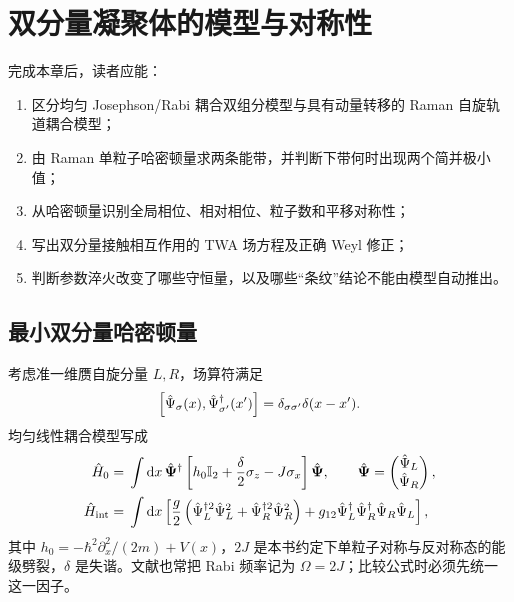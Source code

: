 \chapter{双分量凝聚体的模型与对称性}
\label{ch:two-component-model}

\begin{learningobjectives}
完成本章后，读者应能：
\begin{enumerate}
  \item 区分均匀 Josephson/Rabi 耦合双组分模型与具有动量转移的 Raman 自旋轨道耦合模型；
  \item 由 Raman 单粒子哈密顿量求两条能带，并判断下带何时出现两个简并极小值；
  \item 从哈密顿量识别全局相位、相对相位、粒子数和平移对称性；
  \item 写出双分量接触相互作用的 TWA 场方程及正确 Weyl 修正；
  \item 判断参数淬火改变了哪些守恒量，以及哪些“条纹”结论不能由模型自动推出。
\end{enumerate}
\end{learningobjectives}

\section{最小双分量哈密顿量}

考虑准一维赝自旋分量 $L,R$，场算符满足
\begin{equation}
  \left[\hat\Psi_\sigma(x),\hat\Psi_{\sigma'}^\dagger(x')\right]
  =\delta_{\sigma\sigma'}\delta(x-x').
\end{equation}
均匀线性耦合模型写成
\begin{align}
  \hat H_0={}&\int\mathop{}\!\mathrm{d} x\,
  \hat{\bm\Psi}^\dagger
  \left[h_0\mathbb{I}_2+\frac{\delta}{2}\sigma_z-J\sigma_x\right]
  \hat{\bm\Psi},
  \qquad
  \hat{\bm\Psi}=\begin{pmatrix}\hat\Psi_L\\\hat\Psi_R\end{pmatrix},
  \label{eq:uniform-two-component-h0}\\
  \hat H_{\rm int}={}&\int\mathop{}\!\mathrm{d} x\left[
  \frac{g}{2}\left(
  \hat\Psi_L^{\dagger2}\hat\Psi_L^2+
  \hat\Psi_R^{\dagger2}\hat\Psi_R^2\right)
  +g_{12}\hat\Psi_L^\dagger\hat\Psi_R^\dagger
  \hat\Psi_R\hat\Psi_L\right],
  \label{eq:two-component-interaction}
\end{align}
其中 $h_0=-\hbar^2\partial_x^2/(2m)+V(x)$，$2J$ 是本书约定下单粒子对称与反对称态的能级劈裂，$\delta$ 是失谐。文献也常把 Rabi 频率记为 $\Omega=2J$；比较公式时必须先统一这一因子。

